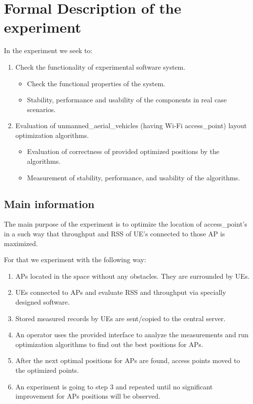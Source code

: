 \section{Formal Description of the
experiment}\label{formal-description-of-the-experiment}

In the experiment we seek to:

\begin{enumerate}
\def\labelenumi{\arabic{enumi}.}
\tightlist
\item
  Check the functionality of experimental software system.
  
  \begin{itemize}
  	\tightlist
  	\item
  	Check the functional properties of the system.
  	\item
  	Stability, performance and usability of the components in real case
  	scenarios.
  \end{itemize}

\item
  Evaluation of \gls{unmanned_aerial_vehicle}s (having Wi-Fi \gls{access_point}) layout
  optimization algorithms.
  
  \begin{itemize}
  	\tightlist
  	\item
  	Evaluation of correctness of provided optimized positions by the
  	algorithms.
  	\item
  	Measurement of stability, performance, and usability of the
  	algorithms.
  \end{itemize}
  
\end{enumerate}


\subsection{Main information}\label{main-information}

The main purpose of the experiment is to optimize the location of \gls{access_point}'s in 
a such way that throughput and RSS of UE's connected to those AP is
maximized.

For that we experiment with the following way:

\begin{enumerate}
\def\labelenumi{\arabic{enumi}.}
\tightlist
\item
  APs located in the space without any obstacles. They are surrounded by
  UEs.
\item
  UEs connected to APs and evaluate RSS and throughput via specially
  designed software.
\item
  Stored measured records by UEs are sent/copied to the central server.
\item
  An operator uses the provided interface to analyze the measurements
  and run optimization algorithms to find out the best positions for
  APs.
\item
  After the next optimal positions for APs are found, access points
  moved to the optimized points.
\item
  An experiment is going to step 3 and repeated until no significant
  improvement for APs positions will be observed.
\end{enumerate}

